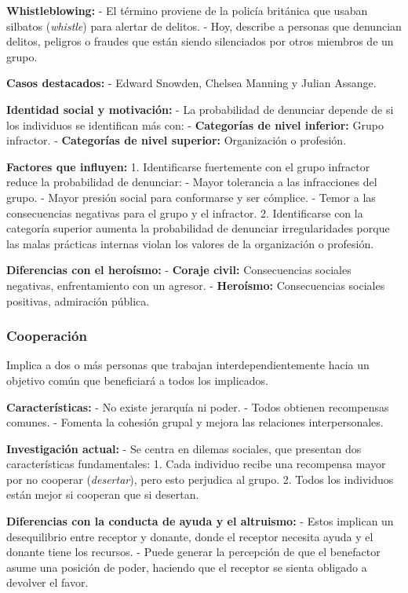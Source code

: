 \documentclass[
]{book}
\begin{document}
\textbf{Whistleblowing:}
- El término proviene de la policía británica que usaban silbatos (\emph{whistle}) para alertar de delitos.
- Hoy, describe a personas que denuncian delitos, peligros o fraudes que están siendo silenciados por otros miembros de un grupo.

\textbf{Casos destacados:}
- Edward Snowden, Chelsea Manning y Julian Assange.

\textbf{Identidad social y motivación:}
- La probabilidad de denunciar depende de si los individuos se identifican más con:
- \textbf{Categorías de nivel inferior:} Grupo infractor.
- \textbf{Categorías de nivel superior:} Organización o profesión.

\textbf{Factores que influyen:}
1. Identificarse fuertemente con el grupo infractor reduce la probabilidad de denunciar:
- Mayor tolerancia a las infracciones del grupo.
- Mayor presión social para conformarse y ser cómplice.
- Temor a las consecuencias negativas para el grupo y el infractor.
2. Identificarse con la categoría superior aumenta la probabilidad de denunciar irregularidades porque las malas prácticas internas violan los valores de la organización o profesión.

\textbf{Diferencias con el heroísmo:}
- \textbf{Coraje civil:} Consecuencias sociales negativas, enfrentamiento con un agresor.
- \textbf{Heroísmo:} Consecuencias sociales positivas, admiración pública.

\subsubsection{Cooperación}\label{cooperaciuxf3n}

Implica a dos o más personas que trabajan interdependientemente hacia un objetivo común que beneficiará a todos los implicados.

\textbf{Características:}
- No existe jerarquía ni poder.
- Todos obtienen recompensas comunes.
- Fomenta la cohesión grupal y mejora las relaciones interpersonales.

\textbf{Investigación actual:}
- Se centra en dilemas sociales, que presentan dos características fundamentales:
1. Cada individuo recibe una recompensa mayor por no cooperar (\emph{desertar}), pero esto perjudica al grupo.
2. Todos los individuos están mejor si cooperan que si desertan.

\textbf{Diferencias con la conducta de ayuda y el altruismo:}
- Estos implican un desequilibrio entre receptor y donante, donde el receptor necesita ayuda y el donante tiene los recursos.
- Puede generar la percepción de que el benefactor asume una posición de poder, haciendo que el receptor se sienta obligado a devolver el favor.
\end{document}
